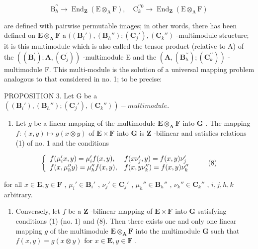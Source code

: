 \[
\mathrm{B} _ {h} ^ {\prime \prime} \rightarrow \operatorname{End} _ {\mathbf {Z}} (\mathrm{E} \otimes_ {\mathrm{A}} \mathrm{F}), \quad \mathrm{C} _ {k} ^ {\prime \prime 0} \rightarrow \operatorname{End} _ {\mathbf {Z}} (\mathrm{E} \otimes_ {\mathrm{A}} \mathrm{F})
\]

are defined with pairwise permutable images; in other words, there has been defined on \(\mathbf{E} \otimes_{\mathbf{A}} \mathbf{F}\) a \(((\mathbf{B}_i'), (\mathbf{B}_h''); (\mathbf{C}_j'), (\mathbf{C}_k'')\) -multimodule structure; it is this multimodule which is also called the tensor product (relative to A) of the \(((\mathbf{B}_i^{\prime});\mathbf{A},(\mathbf{C}_j^{\prime}))\) -multimodule E and the \((\mathbf{A},(\mathbf{B}_h^{\prime\prime});(\mathbf{C}_k^{\prime\prime}))\) -multimodule F. This multi-module is the solution of a universal mapping problem analogous to that considered in no. 1; to be precise:

PROPOSITION 3. Let G be a \(((\mathbf{B}_i'), (\mathbf{B}_h''); (\mathbf{C}_j'), (\mathbf{C}_k''))-multimodule.\)

\begin{enumerate}
\def\labelenumi{(\alph{enumi})}
\tightlist
\item
  Let \(g\) be a linear mapping of the multimodule \(\mathbf{E} \otimes_{\mathbf{A}} \mathbf{F}\) into \(\mathbf{G}\) . The mapping \(f: (x, y) \mapsto g(x \otimes y)\) of \(\mathbf{E} \times \mathbf{F}\) into \(\mathbf{G}\) is \(\mathbf{Z}\) -bilinear and satisfies relations (1) of no. 1 and the conditions
\end{enumerate}

\[
\left\{ \begin{array}{l l} f (\mu_ {i} ^ {\prime} x, y) = \mu_ {i} ^ {\prime} f (x, y), & f (x \nu_ {j} ^ {\prime}, y) = f (x, y) \nu_ {j} ^ {\prime} \\ f (x, \mu_ {h} ^ {\prime \prime} y) = \mu_ {h} ^ {\prime \prime} f (x, y), & f (x, y \nu_ {k} ^ {\prime \prime}) = f (x, y) \nu_ {k} ^ {\prime \prime} \end{array} \right.\tag{8}
\]

for all \(x \in \mathbf{E}, y \in \mathbf{F}\) , \(\mu_i' \in \mathbf{B}_i'\) , \(\nu_j' \in \mathbf{C}_j'\) , \(\mu_h'' \in \mathbf{B}_h''\) , \(\nu_k'' \in \mathbf{C}_{k}''\) , \(i, j, h, k\) arbitrary.

\begin{enumerate}
\def\labelenumi{(\alph{enumi})}
\setcounter{enumi}{1}
\tightlist
\item
  Conversely, let \(f\) be a \(\mathbf{Z}\) -bilinear mapping of \(\mathbf{E} \times \mathbf{F}\) into \(\mathbf{G}\) satisfying conditions (1) (no. 1) and (8). Then there exists one and only one linear mapping \(g\) of the multimodule \(\mathbf{E} \otimes_{\mathbf{A}} \mathbf{F}\) into the multimodule \(\mathbf{G}\) such that \(f(x, y) = g(x \otimes y)\) for \(x \in \mathbf{E}, y \in \mathbf{F}\) .
\end{enumerate}

